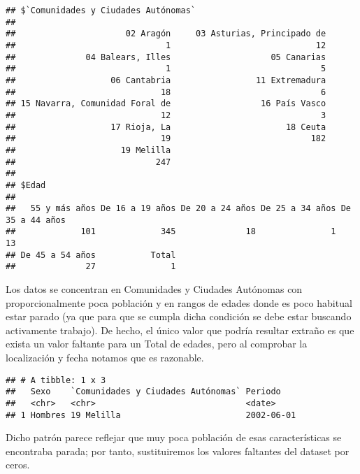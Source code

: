 \documentclass[notspecified,article,submit,moreauthors,pdftex]{Definitions/mdpi}
\newenvironment{Shaded}{\begin{snugshade}}{\end{snugshade}}
\newcommand{\FunctionTok}[1]{\textcolor[rgb]{0.13,0.29,0.53}{\textbf{#1}}}
\newcommand{\NormalTok}[1]{#1}
\newcommand{\SpecialCharTok}[1]{\textcolor[rgb]{0.81,0.36,0.00}{\textbf{#1}}}
\newcommand{\StringTok}[1]{\textcolor[rgb]{0.31,0.60,0.02}{#1}}
\begin{document}
\begin{verbatim}
## $`Comunidades y Ciudades Autónomas`
## 
##                      02 Aragón     03 Asturias, Principado de 
##                              1                             12 
##              04 Balears, Illes                    05 Canarias 
##                              1                              5 
##                   06 Cantabria                 11 Extremadura 
##                             18                              6 
## 15 Navarra, Comunidad Foral de                  16 País Vasco 
##                             12                              3 
##                   17 Rioja, La                       18 Ceuta 
##                             19                            182 
##                     19 Melilla 
##                            247 
## 
## $Edad
## 
##   55 y más años De 16 a 19 años De 20 a 24 años De 25 a 34 años De 35 a 44 años 
##             101             345              18               1              13 
## De 45 a 54 años           Total 
##              27               1
\end{verbatim}

Los datos se concentran en Comunidades y Ciudades Autónomas con
proporcionalmente poca población y en rangos de edades donde es poco
habitual estar parado (ya que para que se cumpla dicha condición se debe
estar buscando activamente trabajo). De hecho, el único valor que podría
resultar extraño es que exista un valor faltante para un Total de
edades, pero al comprobar la localización y fecha notamos que es
razonable.

\begin{Shaded}
\end{Shaded}

\begin{verbatim}
## # A tibble: 1 x 3
##   Sexo    `Comunidades y Ciudades Autónomas` Periodo   
##   <chr>   <chr>                              <date>    
## 1 Hombres 19 Melilla                         2002-06-01
\end{verbatim}

Dicho patrón parece reflejar que muy poca población de esas
características se encontraba parada; por tanto, sustituiremos los
valores faltantes del dataset por ceros.
\end{document}
